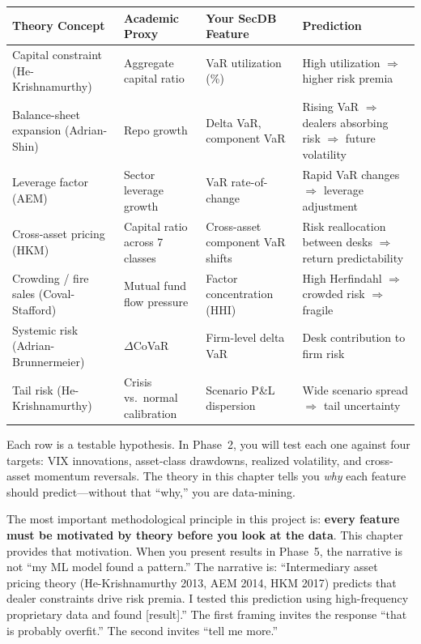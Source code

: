 \begin{center}
\begin{tabular}{p{2.8cm} p{3cm} p{3cm} p{4.5cm}}
\toprule
\textbf{Theory Concept} & \textbf{Academic Proxy} & \textbf{Your SecDB Feature} & \textbf{Prediction} \\
\midrule
Capital constraint (He-Krishnamurthy) & Aggregate capital ratio & VaR utilization (\%) & High utilization $\Rightarrow$ higher risk premia \\
\addlinespace
Balance-sheet expansion (Adrian-Shin) & Repo growth & Delta VaR, component VaR & Rising VaR $\Rightarrow$ dealers absorbing risk $\Rightarrow$ future volatility \\
\addlinespace
Leverage factor (AEM) & Sector leverage growth & VaR rate-of-change & Rapid VaR changes $\Rightarrow$ leverage adjustment \\
\addlinespace
Cross-asset pricing (HKM) & Capital ratio across 7 classes & Cross-asset component VaR shifts & Risk reallocation between desks $\Rightarrow$ return predictability \\
\addlinespace
Crowding / fire sales (Coval-Stafford) & Mutual fund flow pressure & Factor concentration (HHI) & High Herfindahl $\Rightarrow$ crowded risk $\Rightarrow$ fragile \\
\addlinespace
Systemic risk (Adrian-Brunnermeier) & $\Delta$CoVaR & Firm-level delta VaR & Desk contribution to firm risk \\
\addlinespace
Tail risk (He-Krishnamurthy) & Crisis vs.\ normal calibration & Scenario P\&L dispersion & Wide scenario spread $\Rightarrow$ tail uncertainty \\
\bottomrule
\end{tabular}
\end{center}

Each row is a testable hypothesis. In Phase~2, you will test each one against four targets: VIX innovations, asset-class drawdowns, realized volatility, and cross-asset momentum reversals. The theory in this chapter tells you \emph{why} each feature should predict---without that ``why,'' you are data-mining.

\label{sec:project-targets}

\begin{keyidea}
The most important methodological principle in this project is: \textbf{every feature must be motivated by theory before you look at the data}. This chapter provides that motivation. When you present results in Phase~5, the narrative is not ``my ML model found a pattern.'' The narrative is: ``Intermediary asset pricing theory (He-Krishnamurthy 2013, AEM 2014, HKM 2017) predicts that dealer constraints drive risk premia. I tested this prediction using high-frequency proprietary data and found [result].'' The first framing invites the response ``that is probably overfit.'' The second invites ``tell me more.''
\end{keyidea}

